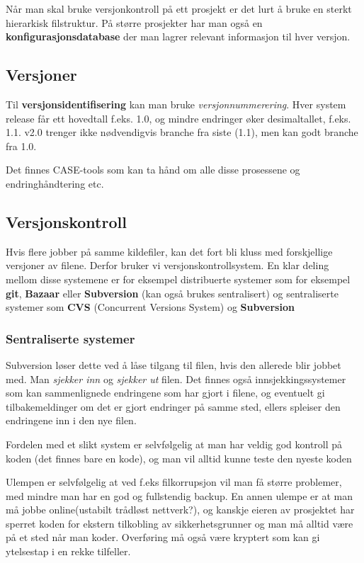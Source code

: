 \documentclass[11pt]{article}
\begin{document}
  Når man skal bruke versjonkontroll på ett prosjekt er det lurt å bruke en sterkt 
  hierarkisk filstruktur. På større prosjekter har man også en \textbf{konfigurasjonsdatabase}
  der man lagrer relevant informasjon til hver versjon.
\subsection{Versjoner}
\label{sec-16.1}


  Til \textbf{versjonsidentifisering} kan man bruke \emph{versjonnummerering}. Hver system release 
  får ett hovedtall f.eks. 1.0, og mindre endringer øker desimaltallet, f.eks. 1.1. v2.0 
  trenger ikke nødvendigvis branche fra siste (1.1), men kan godt branche fra 1.0.
   
  Det finnes CASE-tools som kan ta hånd om alle disse prosessene og endringhåndtering etc.
\subsection{Versjonskontroll}
\label{sec-16.2}

   Hvis flere jobber på samme kildefiler, kan det fort bli kluss med forskjellige versjoner av filene. 
   Derfor bruker vi versjonskontrollsystem.
   En klar deling mellom disse systemene er for eksempel distribuerte systemer
   som for eksempel \textbf{git}, \textbf{Bazaar} eller \textbf{Subversion} (kan også brukes sentralisert)
   og sentraliserte systemer som \textbf{CVS} (Concurrent Versions System) og \textbf{Subversion}
\subsubsection{Sentraliserte systemer}
\label{sec-16.2.1}

    Subversion løser dette ved å låse tilgang til filen, hvis den allerede blir jobbet med. 
    Man \emph{sjekker inn} og \emph{sjekker ut} filen.
    Det finnes også innsjekkingssystemer som kan sammenlignede endringene som har gjort i filene, 
    og eventuelt gi tilbakemeldinger om det er gjort endringer på samme sted, ellers 
    spleiser den endringene inn i den nye filen.
    
    Fordelen med et slikt system er selvfølgelig at man har veldig god kontroll på koden
    (det finnes bare en kode), og man vil alltid kunne teste den nyeste koden
    
    Ulempen er selvfølgelig at ved f.eks filkorrupsjon vil man få større problemer, med mindre 
    man har en god og fullstendig backup. En annen ulempe er at man må jobbe online(ustabilt 
    trådløst nettverk?), og kanskje eieren av prosjektet har sperret koden for ekstern 
    tilkobling av sikkerhetsgrunner og man må alltid være på et sted når man koder. Overføring
    må også være kryptert som kan gi ytelsestap i en rekke tilfeller.
    
\end{document}

